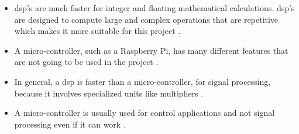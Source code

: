 \begin{itemize}

\item \gls{dsp}'s are much faster for integer and floating mathematical calculations. \gls{dsp}'s are designed to compute large and complex operations that are repetitive which makes it more suitable for this project \citep{diffbet} \citep{esp_simone}.   

\item A micro-controller, such as a Raspberry Pi, has many different features that are not going to be used in the project \citep{diffbet} \citep{esp_simone}. 

\item In general, a \gls{dsp} is faster than a micro-controller, for signal processing, because it involves specialized units like multipliers \citep{diffbet2}. 

\item A micro-controller is usually used for control applications and not signal processing even if it can work \citep{tex_dsp}.

\end{itemize}











